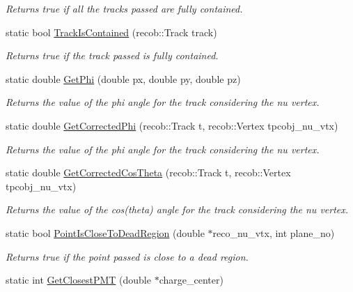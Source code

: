 \begin{DoxyCompactItemize}
\begin{DoxyCompactList}\small\item\em Returns true if all the tracks passed are fully contained. \end{DoxyCompactList}\item 
static bool \hyperlink{classUBXSecHelper_aa0349c7d405ec64cd1b0c7ed3d54a56e}{Track\-Is\-Contained} (recob\-::\-Track track)
\begin{DoxyCompactList}\small\item\em Returns true if the track passed is fully contained. \end{DoxyCompactList}\item 
static double \hyperlink{classUBXSecHelper_a572a710a1ee1387e9d85712df4587111}{Get\-Phi} (double px, double py, double pz)
\begin{DoxyCompactList}\small\item\em Returns the value of the phi angle for the track considering the nu vertex. \end{DoxyCompactList}\item 
static double \hyperlink{classUBXSecHelper_a79b61783bfe19d8dcd33d6aba4c3e61a}{Get\-Corrected\-Phi} (recob\-::\-Track t, recob\-::\-Vertex tpcobj\-\_\-nu\-\_\-vtx)
\begin{DoxyCompactList}\small\item\em Returns the value of the phi angle for the track considering the nu vertex. \end{DoxyCompactList}\item 
static double \hyperlink{classUBXSecHelper_aefae2cc8a7598aa54848247ad228371e}{Get\-Corrected\-Cos\-Theta} (recob\-::\-Track t, recob\-::\-Vertex tpcobj\-\_\-nu\-\_\-vtx)
\begin{DoxyCompactList}\small\item\em Returns the value of the cos(theta) angle for the track considering the nu vertex. \end{DoxyCompactList}\item 
static bool \hyperlink{classUBXSecHelper_a7df598dfbdfdb620737fd69297e67faf}{Point\-Is\-Close\-To\-Dead\-Region} (double $\ast$reco\-\_\-nu\-\_\-vtx, int plane\-\_\-no)
\begin{DoxyCompactList}\small\item\em Returns true if the point passed is close to a dead region. \end{DoxyCompactList}\item 
static int \hyperlink{classUBXSecHelper_a88533a5a59d61351437a1fe2e54aff25}{Get\-Closest\-P\-M\-T} (double $\ast$charge\-\_\-center)

\end{DoxyCompactItemize}
